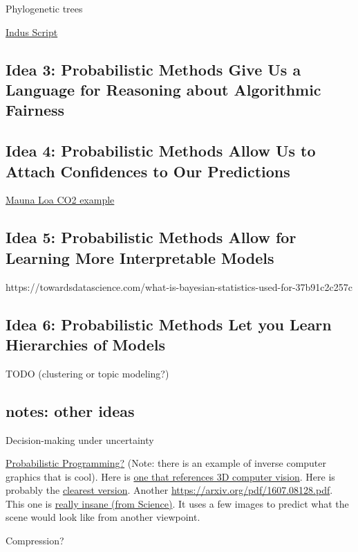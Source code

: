 \documentclass[assignment01_Solutions]{subfiles}
\begin{document}
\bi
\item Phylogenetic trees
\item \href{https://homes.cs.washington.edu/~rao/indus.html}{Indus Script}
\ei


\subsection*{Idea 3: Probabilistic Methods Give Us a Language for Reasoning about Algorithmic Fairness}

\subsection*{Idea 4: Probabilistic Methods Allow Us to Attach Confidences to Our Predictions}

\href{https://docs.pymc.io/notebooks/GP-MaunaLoa.html}{Mauna Loa CO2 example}

\subsection*{Idea 5: Probabilistic Methods Allow for Learning More Interpretable Models}

https://towardsdatascience.com/what-is-bayesian-statistics-used-for-37b91c2c257c

\subsection*{Idea 6: Probabilistic Methods Let you Learn Hierarchies of Models}
TODO (clustering or topic modeling?)


\subsection*{notes: other ideas}
\bi
\item Decision-making under uncertainty
\item \href{https://arxiv.org/pdf/1809.10756.pdf}{Probabilistic Programming?} (Note: there is an example of inverse computer graphics that is cool).  Here is \href{https://www.youtube.com/watch?v=DImI6l_0yiM}{one that references 3D computer vision}.  Here is probably the \href{http://mrkulk.github.io/www_cvpr15/}{clearest version}.  Another \href{cool example}{https://arxiv.org/pdf/1607.08128.pdf}.  This one is \href{https://science.sciencemag.org/content/sci/360/6394/1204.full.pdf}{really insane (from Science)}.   It uses a few images to predict what the scene would look like from another viewpoint.
\item Compression?
\ei
\end{document}
